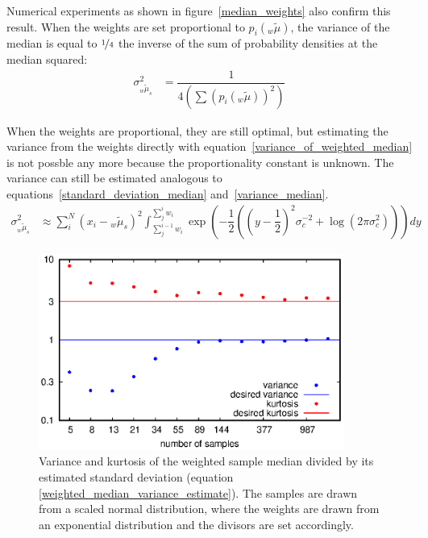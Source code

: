 \documentclass[ejs]{imsart}
\numberwithin{equation}{section}
\theoremstyle{plain}
\begin{document}
\noindent Numerical experiments as shown in figure~\ref{median_weights} also confirm this result.
When the weights are set proportional to $p_i({_w\tilde{\mu}})$, the variance of the median is equal to $\nicefrac{1}{4}$ the inverse of the sum of probability densities at the median squared: %
\begin{align}
\sigma^2_{_w\tilde{\mu}_s} &= \dfrac{1}{4 \left(\sum \left(p_i\left({_w\tilde{\mu}}\right)\right)^2\right)} \label{variance_of_weighted_median}
\end{align}


When the weights are proportional, they are still optimal, but estimating the variance from the weights directly with equation~\ref{variance_of_weighted_median} is not possble any more because the proportionality constant is unknown.
The variance can still be estimated analogous to equations~\ref{standard_deviation_median} and~\ref{variance_median}.
\begin{align}
\sigma^2_{_w\tilde{\mu}_s} &\approx \sum_i^N \left(x_i - {_w\tilde{\mu}_s} \right)^2 \int_{\sum_j^{i-1} w_i}^{\sum_j^i w_i} \exp \left(-\dfrac{1}{2} \left( \left(y-\dfrac{1}{2}\right)^2 \sigma_c^{-2} + \log \left(2 \pi \sigma_c^2 \right) \right) \right) dy \label{weighted_median_variance_estimate}
\end{align}

\begin{figure}[t!]
\includegraphics[width=10cm]{weighted_median_variance_kurtosis.eps}
\caption{Variance and kurtosis of the weighted sample median divided by its estimated standard deviation (equation \ref{weighted_median_variance_estimate}). The samples are drawn from a scaled normal distribution, where the weights are drawn from an exponential distribution and the divisors are set accordingly.} \label{median_variance_kurtosis}
\end{figure}
\end{document}
